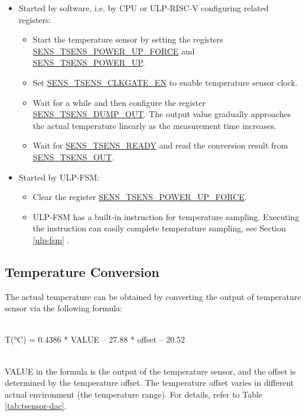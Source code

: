 \documentclass[main\_\_EN.tex]{subfiles}
\begin{document}
\begin{itemize}
   \item Started by software, i.e. by CPU or ULP-RISC-V configuring related registers:
    \begin{itemize}
        \item Start the temperature sensor by setting the registers \hyperref[fielddesc:SENSTSENSPOWERUPFORCE]{SENS\_TSENS\_POWER\_UP\_FORCE} and \hyperref[fielddesc:SENSTSENSPOWERUP]{SENS\_TSENS\_POWER\_UP}.
        \item Set \hyperref[fielddesc:SENSTSENSCLKGATEEN]{SENS\_TSENS\_CLKGATE\_EN} to enable temperature sensor clock.
        \item Wait for a while and then configure the register \hyperref[fielddesc:SENSTSENSDUMPOUT]{SENS\_TSENS\_DUMP\_OUT}. The output value gradually approaches the actual temperature linearly as the measurement time increases.
        \item Wait for \hyperref[fielddesc:SENSTSENSREADY]{SENS\_TSENS\_READY} and read the conversion result from \hyperref[fielddesc:SENSTSENSOUT]{SENS\_TSENS\_OUT}.
    \end{itemize}
    \item Started by ULP-FSM:
    \begin{itemize}
        \item Clear the register \hyperref[fielddesc:SENSTSENSPOWERUPFORCE]{SENS\_TSENS\_POWER\_UP\_FORCE}.
        \item ULP-FSM has a built-in instruction for temperature sampling. Executing the instruction can easily complete temperature sampling, see Section \ref{ulp-fsm} \textit{}.
    \end{itemize}
\end{itemize}


\subsection{Temperature Conversion}

The actual temperature can be obtained by converting the output of temperature sensor via the following formula:\\

~
\begin{centering}
        T(°C) = 0.4386 * VALUE – 27.88 * offset – 20.52\\
\end{centering}
~\\
VALUE in the formula is the output of the temperature sensor, and the offset is determined by the temperature offset. The temperature offset varies in different actual environment (the temperature range). For details, refer to Table \ref{tab:tsensor-dac}.
\end{document}
